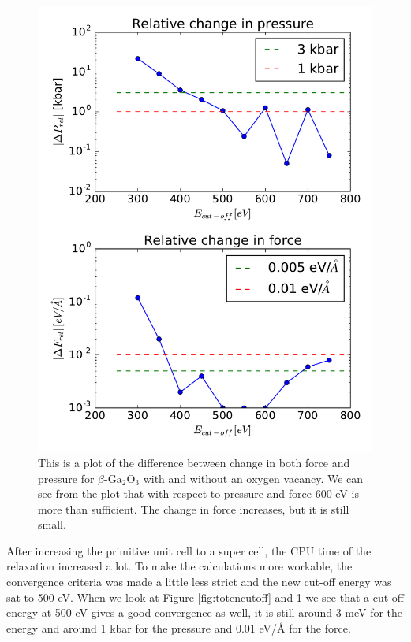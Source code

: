 \begin{figure}[H]
\includegraphics[width=\linewidth]{../fig/deltaforcepressrel.pdf}\caption{This is a plot of the difference between change in both force and pressure for $\beta \text{-Ga}_2\text{O}_3$ with and without an oxygen vacancy. We can see from the plot that with respect to pressure and force 600 eV is more than sufficient. The change in force increases, but it is still small.}\label{fig:forcepresscutoff}
\end{figure}

After increasing the primitive unit cell to a super cell, the CPU time of the relaxation increased a lot. To make the calculations more workable, the convergence criteria was made a little less strict and the new cut-off energy was sat to 500 eV. When we look at Figure \ref{fig:totencutoff} and \ref{fig:forcepresscutoff} we see that a cut-off energy at 500 eV gives a good convergence as well, it is still around 3 meV for the energy and around 1 kbar for the pressure and 0.01 eV/Å for the force.

